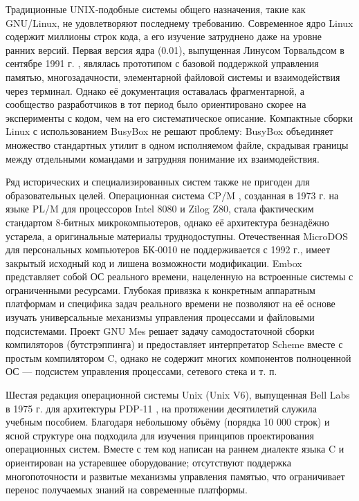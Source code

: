 Традиционные UNIX‑подобные системы общего назначения, такие как GNU/Linux, не удовлетворяют последнему требованию. Современное ядро Linux содержит миллионы строк кода, а его изучение затруднено даже на уровне ранних версий. Первая версия ядра (0.01), выпущенная Линусом Торвальдсом в сентябре 1991 г. \cite{fstlinux}, являлась прототипом с базовой поддержкой управления памятью, многозадачности, элементарной файловой системы и взаимодействия через терминал. Однако её документация оставалась фрагментарной, а сообщество разработчиков в тот период было ориентировано скорее на эксперименты с кодом, чем на его систематическое описание. Компактные сборки Linux с использованием BusyBox \cite{BusyBox} не решают проблему: BusyBox объединяет множество стандартных утилит в одном исполняемом файле, скрадывая границы между отдельными командами и затрудняя понимание их взаимодействия.

Ряд исторических и специализированных систем также не пригоден для образовательных целей. Операционная система CP/M \cite{CPM}, созданная в 1973 г. на языке PL/M для процессоров Intel 8080 и Zilog Z80, стала фактическим стандартом 8‑битных микрокомпьютеров, однако её архитектура безнадёжно устарела, а оригинальные материалы труднодоступны. Отечественная MicroDOS \cite{MicroDOS} для персональных компьютеров БК‑0010 не поддерживается с 1992 г., имеет закрытый исходный код и лишена возможности модификации. Embox \cite{Embox} представляет собой ОС реального времени, нацеленную на встроенные системы с ограниченными ресурсами. Глубокая привязка к конкретным аппаратным платформам и специфика задач реального времени не позволяют на её основе изучать универсальные механизмы управления процессами и файловыми подсистемами. Проект GNU Mes \cite{GNUMes} решает задачу самодостаточной сборки компиляторов (бутстрэппинга) и предоставляет интерпретатор Scheme вместе с простым компилятором C, однако не содержит многих компонентов полноценной ОС — подсистем управления процессами, сетевого стека и т. п.

Шестая редакция операционной системы Unix (Unix V6), выпущенная Bell Labs в 1975 г. для архитектуры PDP‑11 \cite{V6}, на протяжении десятилетий служила учебным пособием. Благодаря небольшому объёму (порядка 10 000 строк) и ясной структуре она подходила для изучения принципов проектирования операционных систем. Вместе с тем код написан на раннем диалекте языка C и ориентирован на устаревшее оборудование; отсутствуют поддержка многопоточности и развитые механизмы управления памятью, что ограничивает перенос получаемых знаний на современные платформы.

